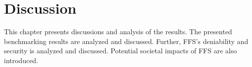 
\chapter{Discussion}
\label{ch:discussion}
This chapter presents discussions and analysis of the results. The presented benchmarking results are analyzed and discussed. Further, FFS's deniability and security is analyzed and discussed. Potential societal impacts of FFS are also introduced.




